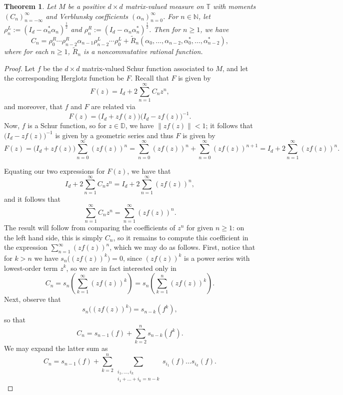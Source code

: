 \documentclass[11pt,reqno]{amsart}
\newcommand\norm[1]{\left\|#1\right\|}
\def\a{\alpha}
\def\r{\rho}
\def\NN{\mathbb{N}}
\def\DD{\mathbb{D}}
\def\TT{\mathbb{T}}
\newtheorem{theorem}{Theorem}[section]
\theoremstyle{definition}
\numberwithin{equation}{section}
\renewcommand{\tilde}{\widetilde}
\begin{document}
\begin{theorem}
\label{thm:MatrixVerForm}
    Let \(M\) be a positive $d \times d$ matrix-valued measure on \(\TT\) with moments \((C_n)_{n=-\infty}^{\infty}\) and Verblunsky coefficients \((\a_n)_{n=0}^{\infty}\). For \(n \in \NN\), let \(\r_n^L := (I_d - \a_n^* \a_n)^{\frac12}\) and \(\r_n^R := (I_d - \a_n \a_n^*)^{\frac12}\). Then for \(n \geq 1\), we have
    \[
         C_{n} = \r_0^R \cdots \r_{n-2}^R \a_{n-1} \r_{n-2}^L \cdots \r_0^L + \tilde{R}_{n}(\a_0, \ldots, \a_{n-2}, \a_0^*, \ldots, \a_{n-2}^*),
    \]
    where for each \(n \geq 1\), \(\tilde{R}_n\) is a noncommutative rational function.
\end{theorem}
\begin{proof}
    Let \(f\) be the $d\times d$ matrix-valued Schur function associated to \(M\), and let the corresponding Herglotz function be \(F\). Recall that \(F\) is given by
    \[
        F(z) = I_d + 2\sum_{n=1}^{\infty} C_n z^n,
    \]
    and moreover, that \(f\) and \(F\) are related via
    \[
        F(z) = \big( I_d + zf(z) \big) \big( I_d - zf(z) \big)^{-1}.
    \]
    Now, \(f\) is a Schur function, so for \(z \in \DD\), we have \(\norm{zf(z)} < 1\); it follows that \(\big(I_d - zf(z)\big)^{-1}\) is given by a geometric series and thus \(F\) is given by
    \[
        F(z) = \big( I_d + zf(z) \big) \sum_{n=0}^{\infty} (zf(z))^n = \sum_{n=0}^{\infty} (zf(z))^n + \sum_{n=0}^{\infty} (zf(z))^{n+1} = I_d + 2\sum_{n=1}^{\infty} (zf(z))^n.
    \]

    Equating our two expressions for \(F(z)\), we have that
    \[
        I_d + 2\sum_{n=1}^{\infty} C_n z^n = I_d + 2\sum_{n=1}^{\infty} (zf(z))^n,
    \]
    and it follows that
    \[
        \sum_{n=1}^{\infty} C_n z^n = \sum_{n=1}^{\infty} (zf(z))^n.
    \]
    The result will follow from comparing the coefficients of \(z^{n}\) for given \(n \geq 1\): on the left hand side, this is simply \(C_n\), so it remains to compute this coefficient in the expression \(\sum_{n=1}^{\infty} (zf(z))^n\), which we may do as follows. First, notice that for \(k > n\) we have \(s_n\big((zf(z))^k \big) = 0\), since \((zf(z))^k\) is a power series with lowest-order term \(z^k\), so we are in fact interested only in
    \[
        C_n = s_n\left(\sum_{k=1}^{\infty} (zf(z))^k \right) = s_n\left(\sum_{k=1}^{n} (zf(z))^k \right).
    \]
    Next, observe that
    \[
        s_n\big((zf(z))^k\big) = s_{n-k}(f^k),
    \]
    so that
    \[
        C_n = s_{n-1}(f) + \sum_{k=2}^n s_{n-k}(f^k).
    \]
    We may expand the latter sum as
    \[
        C_n = s_{n-1}(f) + \sum_{k=2}^n \sum_{\substack{i_1, \ldots, i_k \\ i_1 + \ldots + i_k = n-k}} s_{i_1}(f) \ldots s_{i_k}(f).
    \]


\end{proof}
\end{document}
